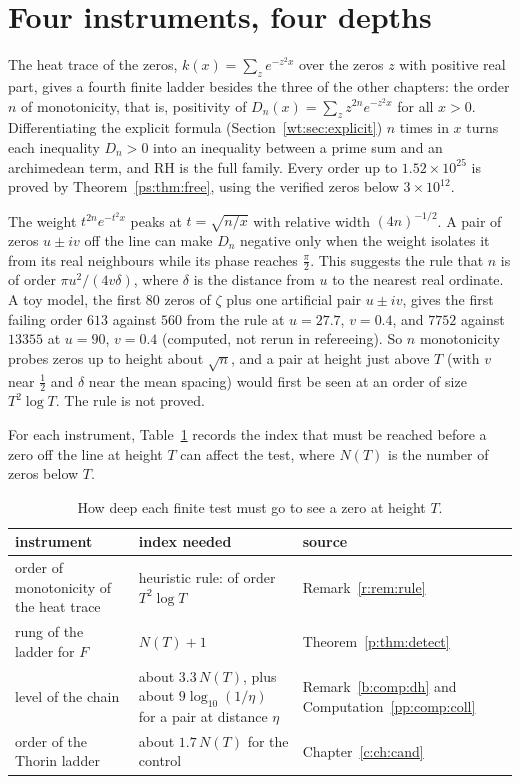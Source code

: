 \section{Four instruments, four depths}\label{r:sec:connect}

The heat trace of the zeros, $k(x)=\sum_ze^{-z^2x}$ over the zeros $z$ with positive real part, gives a fourth finite ladder besides the three of the other chapters: the order $n$ of monotonicity, that is, positivity of $D_n(x)=\sum_zz^{2n}e^{-z^2x}$ for all $x>0$. Differentiating the explicit formula (Section~\ref{wt:sec:explicit}) $n$ times in $x$ turns each inequality $D_n>0$ into an inequality between a prime sum and an archimedean term, and RH is the full family. Every order up to $1.52\times10^{25}$ is proved by Theorem~\ref{ps:thm:free}, using the verified zeros below $3\times10^{12}$.

\begin{remark}\label{r:rem:rule}
The weight $t^{2n}e^{-t^2x}$ peaks at $t=\sqrt{n/x}$ with relative width $(4n)^{-1/2}$. A pair of zeros $u\pm iv$ off the line can make $D_n$ negative only when the weight isolates it from its real neighbours while its phase reaches $\frac\pi2$. This suggests the rule that $n$ is of order $\pi u^2/(4v\delta)$, where $\delta$ is the distance from $u$ to the nearest real ordinate. A toy model, the first $80$ zeros of $\zeta$ plus one artificial pair $u\pm iv$, gives the first failing order $613$ against $560$ from the rule at $u=27.7$, $v=0.4$, and $7752$ against $13355$ at $u=90$, $v=0.4$ (computed, not rerun in refereeing). So $n$ monotonicity probes zeros up to height about $\sqrt n$, and a pair at height just above $T$ (with $v$ near $\frac12$ and $\delta$ near the mean spacing) would first be seen at an order of size $T^2\log T$. The rule is not proved.
\end{remark}



For each instrument, Table~\ref{r:tab:depth} records the index that must be reached before a zero off the line at height $T$ can affect the test, where $N(T)$ is the number of zeros below $T$.

\begin{table}[ht]
\centering\small
\caption{How deep each finite test must go to see a zero at height $T$.}\label{r:tab:depth}
\begin{tabular}{@{}p{}p{}p{}@{}}
\toprule
instrument & index needed & source\\
\midrule
order of monotonicity of the heat trace & heuristic rule: of order $T^2\log T$ & Remark~\ref{r:rem:rule}\\[2pt]
rung of the ladder for $F$ & $N(T)+1$ & Theorem~\ref{p:thm:detect}\\[2pt]
level of the chain & about $3.3\,N(T)$, plus about $9\log_{10}(1/\eta)$ for a pair at distance $\eta$ & Remark~\ref{b:comp:dh} and Computation~\ref{pp:comp:coll}\\[2pt]
order of the Thorin ladder & about $1.7\,N(T)$ for the control & Chapter~\ref{c:ch:cand}\\
\bottomrule
\end{tabular}
\end{table}

